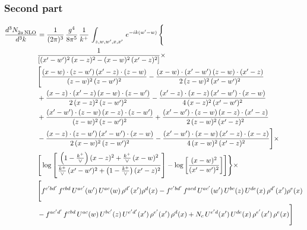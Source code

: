 \documentclass[9pt]{article}
\numberwithin{equation}{section}
\begin{document}
\subsubsection{Second part}
\begin{align}
    \frac{d^{3}N_{2a\,\rm NLO}^{\rm}}{d^{3}k}  & =  \frac{1}{(2\pi)^{3}}\, \frac{g^{4}}{8\pi^{5}}\,\frac{1}{k^{+}}\,\int_{z,w,w^{\prime},x,x'}\, e^{-ik(w^{\prime}-w)}\, \Bigg\{\notag \\
& \frac{1}{\left[(x'-w')^{2}\, (x-z)^{2}-(x-w)^{2}\, (x'-z)^{2}\right]}\times\,\notag \\ & \Bigg[\frac{(x-w)\cdot (z-w')\, (x'-z)\cdot (z-w)}{(z-w)^{2}\,(z-w')^{2}}-\frac{(x-w)\cdot (x'-w')\, (z-w)\cdot (x'-z)}{2\, (z-w)^{2}\, (x'-w')^{2}}\notag \\ & + \frac{(x-z)\cdot (x'-z)\, (x-w)\cdot (z-w')}{2\, (x-z)^{2}\, (z-w')^{2}}-\frac{(x'-z)\cdot (x-z)\, (x'-w')\cdot (x-w)}{4\, (x-z)^{2}\, (x'-w')^{2}}\notag \\ & + \frac{(x'-w')\cdot (z-w)\, (x-z)\cdot (z-w')}{(z-w)^{2}\,(z-w')^{2}}+\frac{(x'-w')\cdot (z-w)\, (x-z)\cdot (x'-z)}{2\, (z-w)^{2}\, (x'-z)^{2}}\notag \\ & - \frac{(x-z)\cdot (z-w')\, (x'-w')\cdot (x-w)}{2\, (x-w)^{2}\, (z-w')^{2}} -\frac{(x'-w')\cdot (x-w)\, (x'-z)\cdot (x-z)}{4\, (x-w)^{2}\, (x'-z)^{2}}\Bigg]\times\notag \\ &  \Bigg[\log{\left[\frac{\left(1-\frac{k^{+}}{\vee}\right)(x-z)^{2}+\frac{k^{+}}{\vee}\,(x-w)^{2}}{\frac{k^{+}}{\vee}\, (x'-w')^{2} + \left(1-\frac{k^{+}}{\vee}\right) (x'-z)^{2}}\right]}-\log{\left[\frac{(x-w)^{2}}{(x'-w')^{2}}\right]}\Bigg]\Bigg\} \times\, \notag \\ & \Bigg[f^{c'bd'}\,f^{cbd}\, U^{ac'}(w')\,U^{ac}(w)\,\rho^{d'}(x')\rho^{d}(x)- f^{c'bd'}\,f^{acd}\,U^{ac'}(w')\,U^{bc}(z)\,U^{de}(x)\,\rho^{d'}(x')\rho^{e}(x) \notag \\ & -f^{ac'd'}\,f^{cbd}\,U^{ac}(w)\,U^{bc'}(z)\,U^{e'd'}(x')\,\rho^{e'}(x')\,\rho^{d}(x) +N_{c}\,U^{e'd}(x')\,U^{de}(x)\,\rho^{e'}(x')\,\rho^{e}(x)\Bigg]
\end{align}
\end{document}
